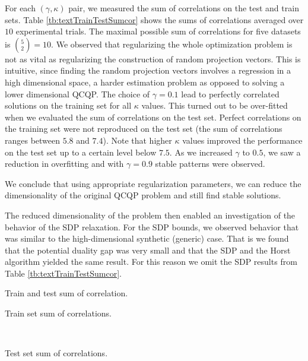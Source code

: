 For each $(\gamma, \kappa)$ pair, we measured the sum of
correlations on the test and train sets. Table
\ref{tb:textTrainTestSumcor} shows the sums of correlations
averaged over $10$ experimental trials. The maximal possible sum
of correlations for five datasets is $\binom{5}{2} = 10$.
We observed that regularizing the whole optimization problem is
not as vital as regularizing the construction of random
projection vectors. This is intuitive, since finding the
random projection vectors involves a regression in a high
dimensional space, a harder estimation problem as opposed to
solving a lower dimensional QCQP.
The choice of $\gamma = 0.1$ lead to perfectly correlated
solutions on the training set for all $\kappa$ values. This turned out to
be over-fitted when we evaluated the sum of correlations on the
test set. Perfect correlations on the training set were not reproduced on
the test set (the sum of correlations ranges between $5.8$ and $7.4$).
Note that higher $\kappa$ values improved the
performance on the test set up to a certain level below
$7.5$. As we increased $\gamma$ to $0.5$, we saw a reduction in
overfitting and with $\gamma = 0.9$  stable patterns were observed.

We conclude that using appropriate regularization parameters,
we can reduce the dimensionality of the
original QCQP problem and still find stable
solutions.

The reduced dimensionality of the problem then enabled an investigation of
the behavior of the SDP relaxation. For the SDP bounds, we observed behavior that was
similar to the high-dimensional synthetic (generic) case. That is
we found that the potential duality gap was very small and that the SDP and the Horst algorithm yielded the same
result. For this reason we omit the SDP results from Table \ref{tb:textTrainTestSumcor}.

\begin{table}[t]
  \caption{Train and test sum of correlation.}
    \begin{subtable}[t]{\textwidth}
        \centering
        \caption{Train set sum of correlations.}
        
        \label{tb:trainText}
    \end{subtable}
    ~
    \begin{subtable}[t]{\textwidth}
        \centering
        \caption{Test set sum of correlations.}
        
        \label{tb:testText}
    \end{subtable}
  \label{tb:textTrainTestSumcor}
\end{table}

